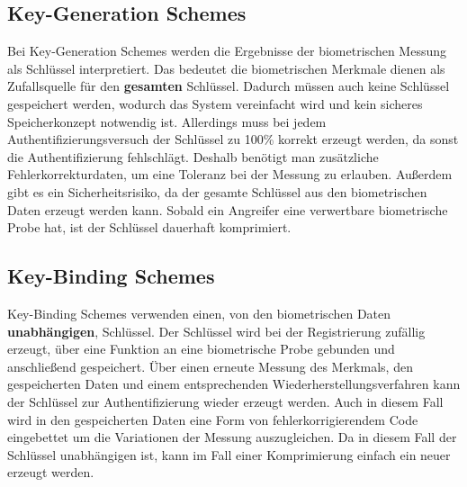 \documentclass{article}
\begin{document}
    \subsection{Key-Generation Schemes}
    Bei Key-Generation Schemes werden die Ergebnisse der biometrischen Messung als Schlüssel interpretiert. Das bedeutet
    die biometrischen Merkmale dienen als Zufallsquelle für den \textbf{gesamten} Schlüssel. Dadurch müssen auch keine
    Schlüssel gespeichert werden, wodurch das System vereinfacht wird und kein sicheres Speicherkonzept notwendig ist.
    Allerdings muss bei jedem Authentifizierungsversuch der Schlüssel zu 100\% korrekt erzeugt werden, da sonst die 
    Authentifizierung fehlschlägt. Deshalb benötigt man zusätzliche Fehlerkorrekturdaten, um eine Toleranz bei der Messung
    zu erlauben. Außerdem gibt es ein Sicherheitsrisiko, da der gesamte Schlüssel aus den biometrischen Daten erzeugt werden
    kann. Sobald ein Angreifer eine verwertbare biometrische Probe hat, ist der Schlüssel dauerhaft komprimiert.
    \subsection{Key-Binding Schemes}
    Key-Binding Schemes verwenden einen, von den biometrischen Daten \textbf{unabhängigen}, Schlüssel. Der Schlüssel
    wird bei der Registrierung zufällig erzeugt, über eine Funktion an eine biometrische Probe gebunden und anschließend
    gespeichert. Über einen erneute Messung des Merkmals, den gespeicherten Daten und einem entsprechenden 
    Wiederherstellungsverfahren kann der Schlüssel zur Authentifizierung wieder erzeugt werden. Auch in diesem Fall
    wird in den gespeicherten Daten eine Form von fehlerkorrigierendem Code eingebettet um die Variationen 
    der Messung auszugleichen. Da in diesem Fall der Schlüssel unabhängigen ist, kann im Fall einer Komprimierung
    einfach ein neuer erzeugt werden.
\end{document}
